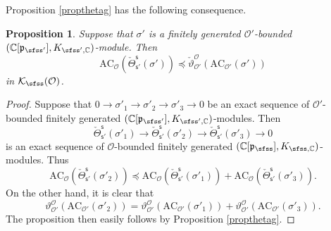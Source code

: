 \documentclass[11pt,a4paper]{amsart}
\newcommand{\CK}{{\mathcal {K}}}
\newcommand{\CO}{{\mathcal {O}}}
\newcommand{\p}{\mathfrak p}
\numberwithin{equation}{section}
\newtheorem{prop}[thm]{Proposition}
\theoremstyle{remark}
\begin{document}
Proposition \ref{propthetag} has the following consequence.
\begin{prop}\label{propthetag2}
Suppose that $\sigma'$ is a finitely generated $\CO'$-bounded $(\C[\p_{\sfss'}], K_{\sfss', \C})$-module. Then
\[
\mathrm{AC}_{\CO}( \check \Theta_{\mathsf s'}^{\mathsf s}(\sigma'))\preceq  \check \vartheta_{\CO'}^{\CO}(\mathrm{AC}_{\CO'}(\sigma'))
\]
in $\CK_\sfss(\CO)$.

\end{prop}
\begin{proof}
Suppose that  $0\rightarrow \sigma'_1\rightarrow \sigma'_2\rightarrow \sigma'_3\rightarrow 0$ be an exact sequence of  $\CO'$-bounded finitely generated $(\C[\p_{\sfss'}], K_{\sfss', \C})$-modules. Then
\[
 \check \Theta_{\mathsf s'}^{\mathsf s}(\sigma'_1)\rightarrow \check \Theta_{\mathsf s'}^{\mathsf s}(\sigma'_2)\rightarrow \check \Theta_{\mathsf s'}^{\mathsf s}(\sigma'_3)\rightarrow 0
 \]
 is  an exact sequence of  $\CO$-bounded finitely generated $(\C[\p_{\sfss}], K_{\sfss, \C})$-modules.
Thus
 \[
   \mathrm{AC}_{\CO}( \check \Theta_{\mathsf s'}^{\mathsf s}(\sigma'_2))\preceq \mathrm{AC}_{\CO}( \check \Theta_{\mathsf s'}^{\mathsf s}(\sigma'_1))+\mathrm{AC}_{\CO}( \check \Theta_{\mathsf s'}^{\mathsf s}(\sigma'_3)).
 \]
 On the other hand, it is clear that
  \[
  \vartheta_{\CO'}^{\CO}(\mathrm{AC}_{\CO'}(\sigma'_2))= \vartheta_{\CO'}^{\CO}(\mathrm{AC}_{\CO'}(\sigma'_1))+ \vartheta_{\CO'}^{\CO}(\mathrm{AC}_{\CO'}(\sigma'_3)).
  \]
The proposition then easily follows by Proposition \ref{propthetag}.
\end{proof}
\end{document}
